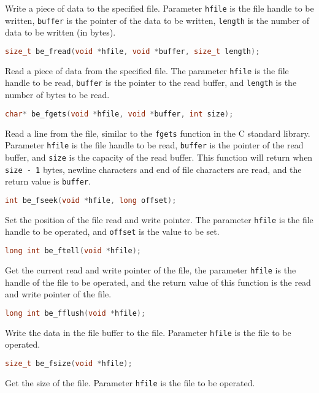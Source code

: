 Write a piece of data to the specified file. Parameter \texttt{hfile} is the file handle to be written, \texttt{buffer} is the pointer of the data to be written, \texttt{length} is the number of data to be written (in bytes).


\begin{lstlisting}[language=c, numbers=none]
size_t be_fread(void *hfile, void *buffer, size_t length);
\end{lstlisting}

Read a piece of data from the specified file. The parameter \texttt{hfile} is the file handle to be read, \texttt{buffer} is the pointer to the read buffer, and \texttt{length} is the number of bytes to be read.


\begin{lstlisting}[language=c, numbers=none]
char* be_fgets(void *hfile, void *buffer, int size);
\end{lstlisting}

Read a line from the file, similar to the \texttt{fgets} function in the C standard library. Parameter \texttt{hfile} is the file handle to be read, \texttt{buffer} is the pointer of the read buffer, and \texttt{size} is the capacity of the read buffer. This function will return when \texttt{size - 1} bytes, newline characters and end of file characters are read, and the return value is \texttt{buffer}.

\begin{lstlisting}[language=c, numbers=none]
int be_fseek(void *hfile, long offset);
\end{lstlisting}

Set the position of the file read and write pointer. The parameter \texttt{hfile} is the file handle to be operated, and \texttt{offset} is the value to be set.


\begin{lstlisting}[language=c, numbers=none]
long int be_ftell(void *hfile);
\end{lstlisting}

Get the current read and write pointer of the file, the parameter \texttt{hfile} is the handle of the file to be operated, and the return value of this function is the read and write pointer of the file.


\begin{lstlisting}[language=c, numbers=none]
long int be_fflush(void *hfile);
\end{lstlisting}

Write the data in the file buffer to the file. Parameter \texttt{hfile} is the file to be operated.


\begin{lstlisting}[language=c, numbers=none]
size_t be_fsize(void *hfile);
\end{lstlisting}

Get the size of the file. Parameter \texttt{hfile} is the file to be operated.